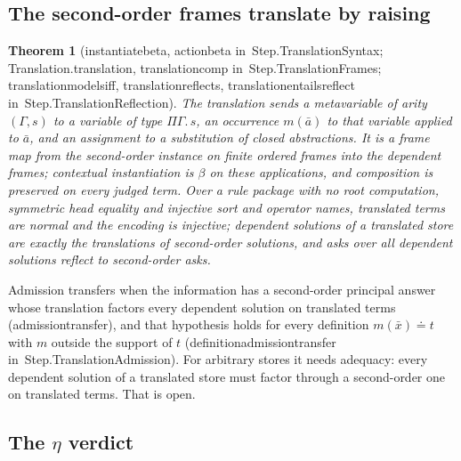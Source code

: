 \documentclass[11pt]{article}
\newtheorem{theorem}{Theorem}
\theoremstyle{remark}
\newcommand{\lean}[1]{{\ttfamily\def\_{\textunderscore\allowbreak}#1}}
\newcommand{\inmod}[1]{in~{\ttfamily\def\_{\textunderscore\allowbreak}#1}}
\begin{document}
\subsection{The second-order frames translate by raising}

\begin{theorem}[\lean{instantiate\_beta}, \lean{action\_beta} \inmod{Step.TranslationSyntax}; \lean{Translation.translation}, \lean{translation\_comp} \inmod{Step.TranslationFrames}; \lean{translation\_models\_iff}, \lean{translation\_reflects}, \lean{translation\_entails\_reflect} \inmod{Step.TranslationReflection}]
The translation sends a metavariable of arity $(\Gamma,s)$ to a variable of type $\Pi\Gamma.\,s$, an
occurrence $m(\bar a)$ to that variable applied to $\bar a$, and an assignment to a substitution of
closed abstractions. It is a frame map from the second-order instance on finite ordered frames into the
dependent frames; contextual instantiation is $\beta$ on these applications, and composition is
preserved on every judged term. Over a rule package with no root computation, symmetric head equality
and injective sort and operator names, translated terms are normal and the encoding is injective;
dependent solutions of a translated store are exactly the translations of second-order solutions, and
asks over all dependent solutions reflect to second-order asks.
\end{theorem}

Admission transfers when the information has a second-order principal answer whose translation
factors every dependent solution on translated terms (\lean{admission\_transfer}), and that hypothesis
holds for every definition $m(\bar x)\doteq t$ with $m$ outside the support of $t$
(\lean{definition\_admission\_transfer} \inmod{Step.TranslationAdmission}). For arbitrary stores it needs
adequacy: every dependent solution of a translated store must factor through a second-order one on
translated terms. That is open.

\subsection{The \texorpdfstring{$\eta$}{eta} verdict}
\end{document}
